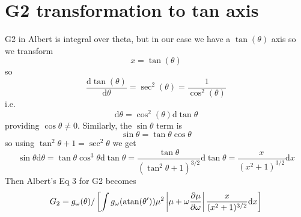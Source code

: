 \documentclass[]{article}
\begin{document}
\section{G2 transformation to tan axis}
G2 in Albert \cite{Albert2005} is integral over theta, but in our case we have a $\tan(\theta)$ axis so we transform 
\begin{equation}
x = \tan(\theta)
\end{equation}
so
\begin{equation}
\frac{\mathrm{d} \tan(\theta)}{\mathrm{d} \theta} = \sec^2(\theta) = \frac{1}{\cos^2(\theta)}
\end{equation}
i.e.
\begin{equation}
\mathrm{d} \theta = \cos^2(\theta) \mathrm{d}\tan\theta
\end{equation}
providing $\cos\theta \ne 0$. Similarly, the $\sin\theta$ term is 
\begin{equation}
\sin\theta = \tan \theta \cos\theta 
\end{equation}
so using $ \tan^2\theta + 1 = \sec^2\theta$ we get
\begin{equation}\label{TanTransform}
\sin\theta \mathrm{d}\theta = \tan\theta \cos^3\theta \mathrm{d}\tan\theta= \frac{\tan\theta}{(\tan^2 \theta + 1)^{3/2}}\mathrm{d}\tan\theta = \frac{x}{(x^2+1)^{3/2}} \mathrm{d}x
\end{equation}
Then Albert's \cite{Albert2005}  Eq 3 for G2 becomes
\begin{equation}
G_2 = g_\omega(\theta)/\left[\int g_\omega(\mathrm{atan}(\theta^\prime)) \mu^2 \left| \mu + \omega \frac{\partial \mu}{\partial\omega} \right| \frac{x}{(x^2+1)^{3/2}} \mathrm{d}x\right]
\end{equation}
\end{document}
